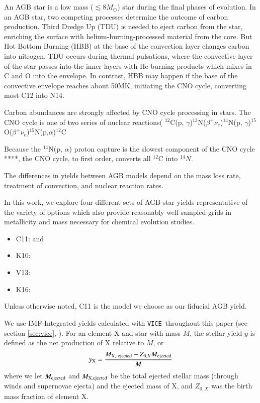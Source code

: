 \documentclass[12pt,oneside]{report}
\newcommand{\VICE}{\texttt{VICE}}
\newcommand{\sun}{\ensuremath{\odot}}
\begin{document}
An AGB star is a low mass ($\lesssim 8 M_{\sun}$) star during the final phases of evolution.  In an AGB star, two competing processes determine the outcome of carbon production.
Third Dredge Up (TDU) is needed to eject carbon from the star, enriching the surface with helium-burning-processed material from the core. But Hot Bottom Burning (HBB) at the base of the convection layer changes carbon into nitrogen. 
TDU occurs during thermal pulsations, where the convective layer of the star passes into the inner layers with He-burning products which mixes in C and O into the envelope. In contrast, HBB may happen if the base of the convective envelope reaches about 50MK, initiating the CNO cycle, converting most C12 into N14. 

Carbon abundances are strongly affected by CNO cycle processing in stars. The CNO cycle is one of two series of nuclear reactions( $^{12}$C(p, $\gamma$)$^{13}$N($\beta^+ \nu_e$)$^{14}$N(p, $\gamma$)$^{15}$O($\beta^+\nu_e$)$^{15}$N(p,$\alpha$)$^{12}$C

Because the $^{14}$N(p, $\alpha$) proton capture is the slowest component of the CNO cycle ****, the CNO cycle, to first order, converts all $^{12}$C into $^{14}N$. 

The differences in yields between AGB models depend on the mass loss rate, treatment of convection, and nuclear reaction rates. 

In this work, we explore four different sets of AGB star yields representative of the variety of options which also provide reasonably well sampled grids in metallicity and mass necessary for chemical evolution studies.
\begin{itemize}
    \item C11: \citet{cristallo+11} and \citet{cristallo+15}
    \item K10: \citet{karakas10}
    \item V13: \citet{ventura+13}
    \item K16: \citet{KL16} \citet{karakas+18}
\end{itemize}
Unless otherwise noted, C11 is the model we choose as our fiducial AGB yield. 

We use IMF-Integrated yields calculated with \VICE~throughout this paper (see
section \ref{sec:vice}, \citet{james+21, james+22}). For an element X and star
with mass $M$, the stellar yield $y$ is defined as the net production of X relative 
to $M$, or
\begin{equation}
    y_{\rm X} = \frac{M_{\rm X,\ ejected} - Z_{0, X} M_{\rm ejected}}{M}   
\end{equation}
where we let $M_{\rm ejected}$ and $M_{\rm X, ejected}$ be the total ejected
stellar mass (through winds and supernovae ejecta) and the ejected mass of X,
and $Z_{0, X}$ was the birth mass fraction of element X.
\end{document}
